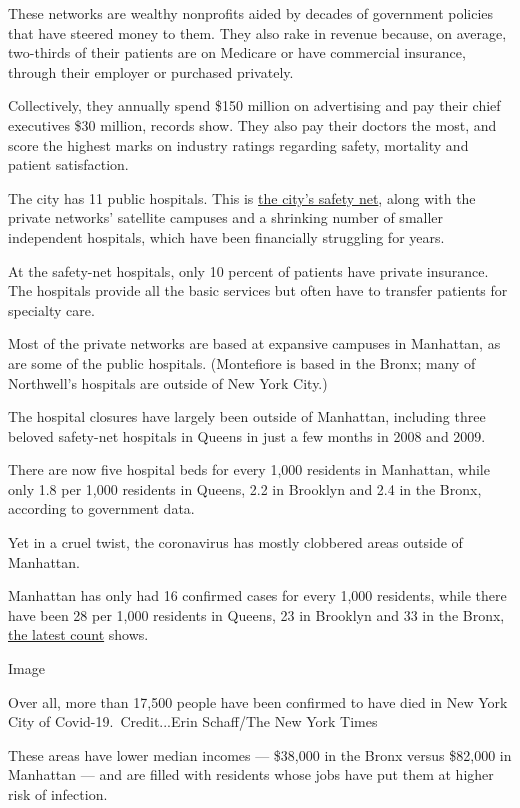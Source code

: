 These networks are wealthy nonprofits aided by decades of government
policies that have steered money to them. They also rake in revenue
because, on average, two-thirds of their patients are on Medicare or
have commercial insurance, through their employer or purchased
privately.

Collectively, they annually spend \$150 million on advertising and pay
their chief executives \$30 million, records show. They also pay their
doctors the most, and score the highest marks on industry ratings
regarding safety, mortality and patient satisfaction.

The city has 11 public hospitals. This is
\href{https://www.nytimes.com/2020/04/26/nyregion/coronavirus-new-york-university-hospital.html}{the
city's safety net}, along with the private networks' satellite campuses
and a shrinking number of smaller independent hospitals, which have been
financially struggling for years.

At the safety-net hospitals, only 10 percent of patients have private
insurance. The hospitals provide all the basic services but often have
to transfer patients for specialty care.

Most of the private networks are based at expansive campuses in
Manhattan, as are some of the public hospitals. (Montefiore is based in
the Bronx; many of Northwell's hospitals are outside of New York City.)

The hospital closures have largely been outside of Manhattan, including
three beloved safety-net hospitals in Queens in just a few months in
2008 and 2009.

There are now five hospital beds for every 1,000 residents in Manhattan,
while only 1.8 per 1,000 residents in Queens, 2.2 in Brooklyn and 2.4 in
the Bronx, according to government data.

Yet in a cruel twist, the coronavirus has mostly clobbered areas outside
of Manhattan.

Manhattan has only had 16 confirmed cases for every 1,000 residents,
while there have been 28 per 1,000 residents in Queens, 23 in Brooklyn
and 33 in the Bronx,
\href{https://www1.nyc.gov/site/doh/covid/covid-19-data.page}{the latest
count} shows.

Image

Over all, more than 17,500 people have been confirmed to have died in
New York City of Covid-19.~Credit...Erin Schaff/The New York Times

These areas have lower median incomes --- \$38,000 in the Bronx versus
\$82,000 in Manhattan --- and are filled with residents whose jobs have
put them at higher risk of infection.

